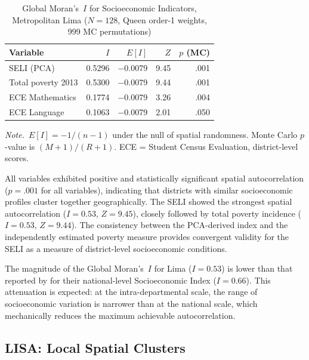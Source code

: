\documentclass[12pt,a4paper,twoside]{article}
\begin{document}
\begin{table}[htbp]
  \centering
  \footnotesize
  \caption{Global Moran's~$I$ for Socioeconomic Indicators, Metropolitan Lima
           ($N = 128$, Queen order-1 weights, 999 MC permutations)}
  \label{tab:moran_global}
  \begin{tabular}{lrrrr}
    \toprule
    Variable & $I$ & $E[I]$ & $Z$ & $p$ (MC) \\
    \midrule
    SELI (PCA)          & 0.5296 & $-$0.0079 & 9.45 & .001 \\
    Total poverty 2013  & 0.5300 & $-$0.0079 & 9.44 & .001 \\
    ECE Mathematics     & 0.1774 & $-$0.0079 & 3.26 & .004 \\
    ECE Language        & 0.1063 & $-$0.0079 & 2.01 & .050 \\
    \bottomrule
  \end{tabular}

  \vspace{4pt}
  \begin{minipage}{0.9\textwidth}
  \footnotesize\textit{Note.}\ $E[I] = -1/(n-1)$ under the null of spatial
  randomness. Monte Carlo $p$-value is $(M+1)/(R+1)$.
  ECE = Student Census Evaluation, district-level scores.
  \end{minipage}
\end{table}

All variables exhibited positive and statistically significant spatial
autocorrelation ($p = .001$ for all variables), indicating that districts with
similar socioeconomic profiles cluster together geographically. The SELI showed
the strongest spatial autocorrelation ($I = 0.53$, $Z = 9.45$), closely followed
by total poverty incidence ($I = 0.53$, $Z = 9.44$). The consistency between the
PCA-derived index and the independently estimated poverty measure provides
convergent validity for the SELI as a measure of district-level socioeconomic
conditions.

The magnitude of the Global Moran's~$I$ for Lima ($I = 0.53$) is lower than that
reported by \citet{alonso2025segregacion} for their national-level Socioeconomic
Index ($I = 0.66$). This attenuation is expected: at the intra-departmental scale,
the range of socioeconomic variation is narrower than at the national scale, which
mechanically reduces the maximum achievable autocorrelation.

\subsection{LISA: Local Spatial Clusters}
\end{document}
